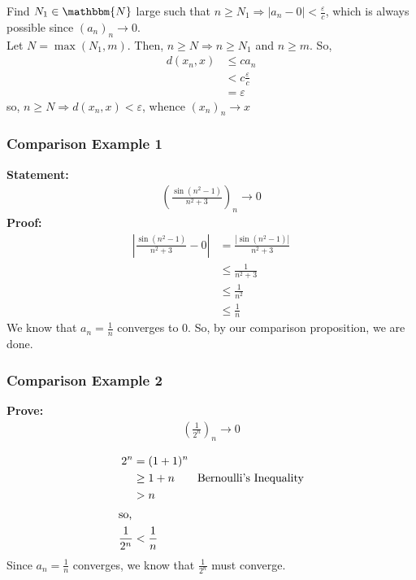 \documentclass[10pt]{extarticle}
\newcommand{\N}{\mathbbm{N}}
\begin{document}
    Find $N_1\in \N$ large such that $n \geq N_1 \Rightarrow |a_n - 0| < \frac{\varepsilon}{c}$, which is always possible since $(a_n)_n \rightarrow 0$.\\

    Let $N = \max(N_1,m)$. Then, $n \geq N\Rightarrow n\geq N_1$ and $n\geq m$. So,
    \begin{align*}
      d(x_n,x) &\leq ca_n\\
      &< c\frac{\varepsilon}{c}\\
      &=\varepsilon
    \end{align*}
    so, $n\geq N \Rightarrow d(x_n,x) < \varepsilon$, whence $(x_n)_n \rightarrow x$
    \subsubsection{Comparison Example 1}%
    \textbf{Statement:}
      \begin{align*}
        \left(\frac{\sin(n^2-1)}{n^2 + 3}\right)_n \rightarrow 0
      \end{align*}
      \textbf{Proof:}
      \begin{align*}
        \left|\frac{\sin(n^2 - 1)}{n^2 + 3} - 0\right| &= \frac{|\sin(n^2 - 1)|}{n^2 + 3}\\
                                                       &\leq \frac{1}{n^2 + 3}\\
                                                       &\leq \frac{1}{n^2}\\
                                                       &\leq \frac{1}{n}
      \end{align*}
      We know that $a_n = \frac{1}{n}$ converges to $0$. So, by our comparison proposition, we are done.
    \subsubsection{Comparison Example 2}%
    \textbf{Prove:}
      \begin{align*}
        \left(\frac{1}{2^n}\right)_n \rightarrow 0
      \end{align*}

      \begin{align*}
        2^n &= (1+1)^n\\
            &\geq 1+n\tag*{Bernoulli's Inequality}\\
            &>n\\
            \shortintertext{so,}
        \frac{1}{2^n} &< \frac{1}{n}
      \end{align*}
      Since $a_n = \frac{1}{n}$ converges, we know that $\frac{1}{2^n}$ must converge.
\end{document}
